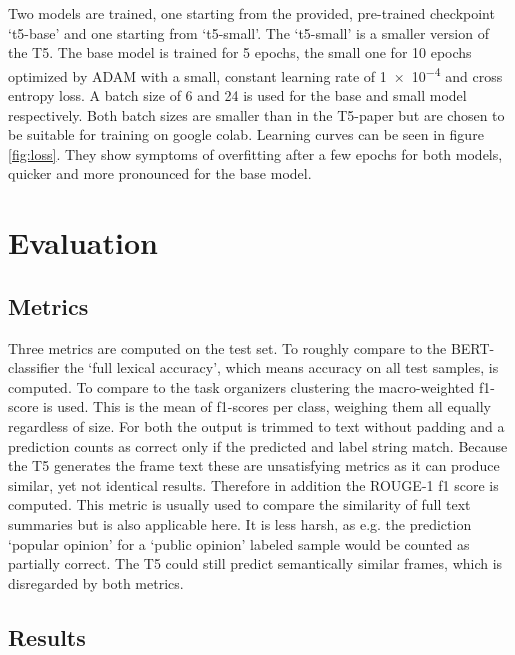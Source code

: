 \documentclass[11pt,a4paper,onecolumn,oneside,notitlepage]{article}
\begin{document}
Two models are trained, one starting from the provided, pre-trained checkpoint ‘t5-base’ and one starting from ‘t5-small’. The ‘t5-small’ is a smaller version of the T5. The base model is trained for \num{5} epochs, the small one for \num{10} epochs optimized by ADAM \citep{kingma2017adam} with a small, constant learning rate of \num{1e-4} and cross entropy loss. A batch size of 6 and 24 is used for the base and small model respectively. Both batch sizes are smaller than in the T5-paper but are chosen to be suitable for training on google colab. Learning curves can be seen in figure \ref{fig:loss}. They show symptoms of overfitting after a few epochs for both models, quicker and more pronounced for the base model.

\section{Evaluation}
\subsection{Metrics}
Three metrics are computed on the test set. To roughly compare to the BERT-classifier the ‘full lexical accuracy’, which means accuracy on all test samples, is computed. To compare to the task organizers clustering the macro-weighted f1-score is used. This is the mean of f1-scores per class, weighing them all equally regardless of size. For both the output is trimmed to text without padding and a prediction counts as correct only if the predicted and label string match. Because the T5 generates the frame text these are unsatisfying metrics as it can produce similar, yet not identical results. Therefore in addition the ROUGE-1 f1 \citep{rouge} score is computed. This metric is usually used to compare the similarity of full text summaries but is also applicable here. It is less harsh, as e.g. the prediction ‘popular opinion’ for a ‘public opinion’ labeled sample would be counted as partially correct. The T5 could still predict semantically similar frames, which is disregarded by both metrics.

\subsection{Results}
\end{document}
